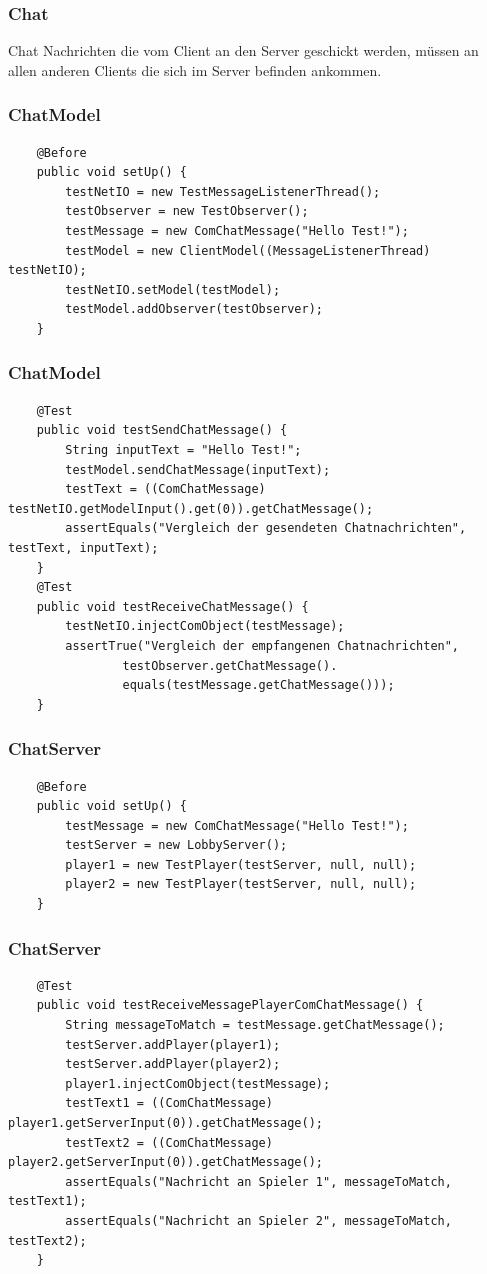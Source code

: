 \documentclass{beamer}
\begin{document}
\begin{frame}
\frametitle{Chat}
	\begin{block}
		{Chat} Nachrichten die vom Client an den Server geschickt werden, müssen an
		allen anderen Clients die sich im Server befinden ankommen.
	\end{block}
\end{frame}

\begin{frame}[fragile]
\frametitle{ChatModel}
\begin{lstlisting}
	@Before  
    public void setUp() {
		testNetIO = new TestMessageListenerThread();
		testObserver = new TestObserver();
		testMessage = new ComChatMessage("Hello Test!");
		testModel = new ClientModel((MessageListenerThread) testNetIO);
		testNetIO.setModel(testModel);
		testModel.addObserver(testObserver);
    }
\end{lstlisting}
\end{frame}


\begin{frame}[fragile]
\frametitle{ChatModel}
\begin{lstlisting}
	@Test
	public void testSendChatMessage() {
		String inputText = "Hello Test!";
		testModel.sendChatMessage(inputText);
		testText = ((ComChatMessage) 			testNetIO.getModelInput().get(0)).getChatMessage();
		assertEquals("Vergleich der gesendeten Chatnachrichten", testText, inputText);
	}	
	@Test
	public void testReceiveChatMessage() {
		testNetIO.injectComObject(testMessage);
		assertTrue("Vergleich der empfangenen Chatnachrichten", 
				testObserver.getChatMessage().
				equals(testMessage.getChatMessage()));
	}
\end{lstlisting}
\end{frame}


\begin{frame}[fragile]
\frametitle{ChatServer}
\begin{lstlisting}
	@Before
	public void setUp() {
		testMessage = new ComChatMessage("Hello Test!");
		testServer = new LobbyServer();
		player1 = new TestPlayer(testServer, null, null);
		player2 = new TestPlayer(testServer, null, null);
	}
\end{lstlisting}
\end{frame}


\begin{frame}[fragile]
\frametitle{ChatServer}
\begin{lstlisting}
	@Test
	public void testReceiveMessagePlayerComChatMessage() {
		String messageToMatch = testMessage.getChatMessage();
		testServer.addPlayer(player1);
		testServer.addPlayer(player2);
		player1.injectComObject(testMessage);
		testText1 = ((ComChatMessage) player1.getServerInput(0)).getChatMessage();
		testText2 = ((ComChatMessage) player2.getServerInput(0)).getChatMessage();
		assertEquals("Nachricht an Spieler 1", messageToMatch, testText1);
		assertEquals("Nachricht an Spieler 2", messageToMatch, testText2);
	}
\end{lstlisting}
\end{frame}
\end{document}
